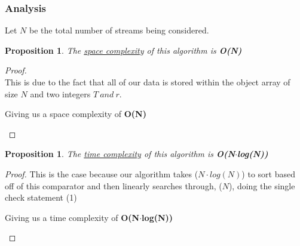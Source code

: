 \documentclass[12pt]{article}
\newtheorem{proposition}[theorem]{Proposition}
\begin{document}
\subsubsection{Analysis}
\begin{center}Let $N$ be the total number of streams being considered.\end{center}

\begin{proposition}
\label{numq}
The \underline{space complexity} of this algorithm is \textbf{O(N)}
\end{proposition}

\begin{proof}
~ \\ \indent This is due to the fact that all of our data is stored
within the object array of size $N$ and two integers $T\ and\ r$.
\begin{center}
    Giving us a space complexity of \textbf{O(N)}
\end{center}
\end{proof}

\begin{proposition}
\label{numq}
The \underline{time complexity} of this algorithm is \textbf{O(N$\cdot$log(N))}
\end{proposition}

\begin{proof}
This is the case because our algorithm takes ($N\cdot log(N)$) to sort
based off of this comparator and then linearly searches through, ($N$),
doing the single check statement (1)
\begin{center}
    Giving us a time complexity of \textbf{O(N$\cdot$log(N))}
\end{center}
\end{proof}




\end{document}
